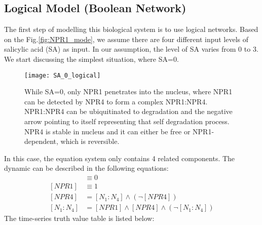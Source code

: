 \subsection{Logical Model (Boolean Network)}
The first step of modelling this biological system is to use logical networks. Based on the Fig.\ref{fig:NPR1_mode}, we assume there are four different input levels of salicylic acid (SA) as input. In our assumption, the level of SA varies from 0 to 3. We start discussing the simplest situation, where SA=0. \\
\begin{figure}[H]
	\centering
	\texttt{[image: SA\_0\_logical]}
	\caption{While SA=0, only NPR1 penetrates into the nucleus, where NPR1 can be detected by NPR4 to form a complex NPR1:NPR4. NPR1:NPR4 can be ubiquitinated to degradation and the negative arrow pointing to itself representing that self degradation process. NPR4 is stable in nucleus and it can either be free or NPR1-dependent, which is reversible.}
	\label{fig:SA_0}
\end{figure}
In this case, the equation system only contains 4 related components. The dynamic can be described in the following equations:\\
\begin{align*}
[SA] &\equiv 0 \\
[NPR1] &\equiv 1 \\
[NPR4] &= [N_1:N_4] \wedge (\neg [NPR4]) \\
[N_1:N_4] &= [NPR1] \wedge[NPR4] \wedge (\neg [N_1:N_4])
\end{align*}
The time-series truth value table is listed below:\\


